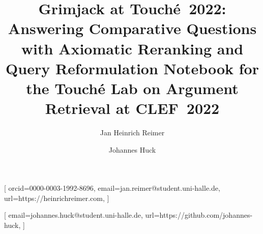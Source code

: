 \documentclass{ceurart}
\begin{document}

\title{%
  Grimjack at \texorpdfstring{Touché~2022}{Touche 2022}:\texorpdfstring{\\}{ }
  Answering Comparative Questions with Axiomatic Reranking and Query Reformulation%
}
\title[mode=sub]{%
  Notebook for the Touché Lab on Argument Retrieval at CLEF\ 2022%
}

\author{Jan Heinrich Reimer}[
  orcid=0000-0003-1992-8696,
  email=jan.reimer@student.uni-halle.de,
  url=https://heinrichreimer.com,
]
\author{Johannes Huck}[
  email=johannes.huck@student.uni-halle.de,
  url=https://github.com/johannes-huck,
]

\address{%
  Martin-Luther-Universität Halle-Wittenberg,
  06099~Halle~(Saale), Germany
}



\maketitle








\end{document}
